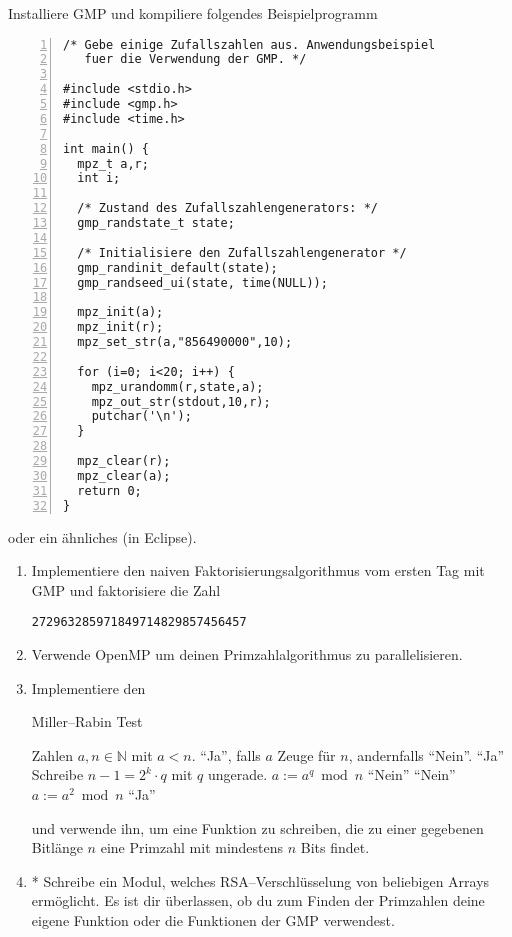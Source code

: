 \documentclass{uebungszettel}
\begin{document}
\begin{aufg} Installiere GMP und kompiliere folgendes Beispielprogramm 
\begin{codelisting}
\begin{lstlisting}[numbers=left,numberstyle=\tiny,frame=tlrb]
/* Gebe einige Zufallszahlen aus. Anwendungsbeispiel
   fuer die Verwendung der GMP. */

#include <stdio.h>
#include <gmp.h>
#include <time.h>

int main() {
  mpz_t a,r;
  int i; 

  /* Zustand des Zufallszahlengenerators: */
  gmp_randstate_t state; 

  /* Initialisiere den Zufallszahlengenerator */
  gmp_randinit_default(state);
  gmp_randseed_ui(state, time(NULL));

  mpz_init(a); 
  mpz_init(r);
  mpz_set_str(a,"856490000",10);

  for (i=0; i<20; i++) {
    mpz_urandomm(r,state,a);
    mpz_out_str(stdout,10,r);
    putchar('\n');
  }

  mpz_clear(r);
  mpz_clear(a);
  return 0;
}
\end{lstlisting}
\end{codelisting}
oder ein ähnliches (in Eclipse).
\end{aufg}

\pagebreak[4]

\begin{aufg}
\begin{enumerate}
\item Implementiere den naiven Faktorisierungsalgorithmus vom ersten Tag mit GMP und faktorisiere die Zahl
\begin{center}
\verb|272963285971849714829857456457|
\end{center}
\item Verwende OpenMP um deinen Primzahlalgorithmus zu parallelisieren.
\item Implementiere den
\begin{algorithm}[H]
\caption{Miller--Rabin Test}
\label{alg2}
\begin{algorithmic}[1]
\REQUIRE Zahlen $a,n \in \mathbb{N}$ mit $a < n$.
\ENSURE ``Ja'', falls $a$ Zeuge für $n$, andernfalls ``Nein''.
  \RETURN ``Ja''
\ENDIF
\STATE Schreibe $n - 1 = 2^k \cdot q$ mit $q$ ungerade.
\STATE \SET $a := a^q \bmod n$
  \RETURN ``Nein''
\ENDIF
{}
    \RETURN ``Nein''
  \ELSE
    \STATE \SET $a := a^2 \bmod n$
  \ENDIF
\ENDFOR
\RETURN ``Ja''
\end{algorithmic}
\end{algorithm}

\noindent und verwende ihn, um eine Funktion zu schreiben, die zu einer gegebenen Bitlänge $n$ eine Primzahl mit mindestens $n$ Bits findet. 
\item* Schreibe ein Modul, welches RSA--Verschlüsselung von beliebigen Arrays ermöglicht. Es ist dir überlassen, ob du zum Finden der Primzahlen deine eigene Funktion oder die Funktionen der GMP verwendest.
\end{enumerate}
\end{aufg}
\end{document}
